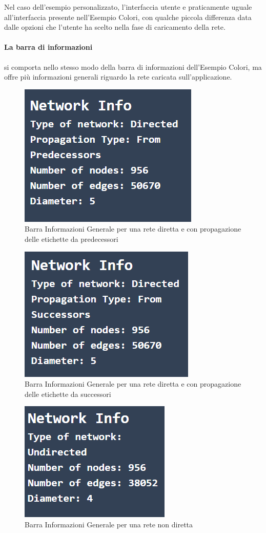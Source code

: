 \documentclass[a4paper,12pt]{report}
\begin{document}
			Nel caso dell'esempio personalizzato, l'interfaccia utente e praticamente uguale all'interfaccia presente nell'Esempio Colori, con qualche piccola differenza data dalle opzioni che l'utente ha scelto nella fase di caricamento della rete.

			\paragraph*{La barra di informazioni} si comporta nello stesso modo della barra di informazioni dell'Esempio Colori, ma offre più informazioni generali riguardo la rete caricata sull'applicazione.
			
			\begin{center}
				\begin{figure}[H]
				\centering
				\includegraphics[width=0.5\linewidth]{infobargeneralcustom}
				\caption{Barra Informazioni Generale per una rete diretta e con propagazione delle etichette da predecessori}
				\end{figure}
				\begin{figure}[H]
				\centering
				\includegraphics[width=0.5\linewidth]{infobargeneralcustomdirectedsuccessors}
				\caption{Barra Informazioni Generale per una rete diretta e con propagazione delle etichette da successori}
				\end{figure}
				\begin{figure}[H]
				\centering
				\includegraphics[width=0.5\linewidth]{infobargeneralcustomundirected}
				\caption{Barra Informazioni Generale per una rete non diretta}
				\end{figure}
			\end{center}
\end{document}
